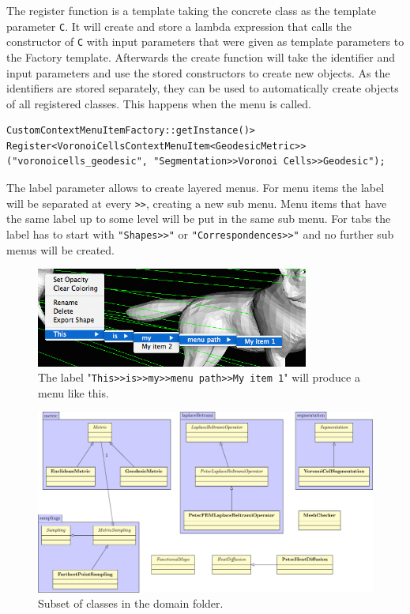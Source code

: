 The register function is a template taking the concrete class  as the template parameter \texttt{C}. It will create and store a lambda expression that calls the constructor of \texttt{C} with input parameters that were given as template parameters to the Factory template. Afterwards the create function will take the identifier and input parameters and use the stored constructors to create new objects. As the identifiers are stored separately, they can be used to automatically create objects of all registered classes. This happens when the menu is called.

\begin{lstlisting}[style=lstStyleCpp, numbers=none]
CustomContextMenuItemFactory::getInstance()>
Register<VoronoiCellsContextMenuItem<GeodesicMetric>>
("voronoicells_geodesic", "Segmentation>>Voronoi Cells>>Geodesic");
\end{lstlisting}

The label parameter allows to create layered menus. For menu items the label will be separated at every \texttt{>>}, creating a new sub menu. Menu items that have the same label up to some level will be put in the same sub menu. For tabs the label has to start with \texttt{"Shapes>>"} or \texttt{"Correspondences>>"} and no further sub menus will be created. 

\begin{figure}[h]
	\centering
	\includegraphics[width=0.8\textwidth]{images/menu.png}
	\caption{The label "\texttt{This>>is>>my>>menu path>>My item 1}" will produce a menu like this.}
\end{figure}

\begin{figure}[h]
	\centering
	\includegraphics[width=\textwidth]{images/diagram2.pdf}
	\caption{Subset of classes in the domain folder.}
\end{figure}

